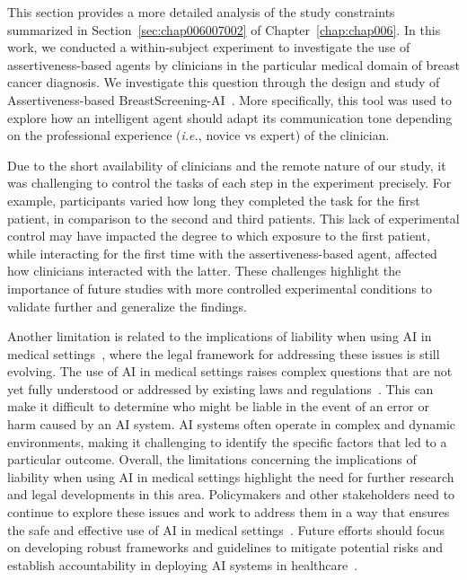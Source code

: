 This section provides a more detailed analysis of the study constraints summarized in Section~\ref{sec:chap006007002} of Chapter~\ref{chap:chap006}.
In this work, we conducted a within-subject experiment to investigate the use of assertiveness-based agents by clinicians in the particular medical domain of breast cancer diagnosis.
We investigate this question through the design and study of Assertiveness-based BreastScreening-AI~\cite{10.1145/3544548.3580682}.
More specifically, this tool was used to explore how an intelligent agent should adapt its communication tone depending on the professional experience ({\it i.e.}, novice vs expert) of the clinician.

Due to the short availability of clinicians and the remote nature of our study, it was challenging to control the tasks of each step in the experiment precisely.
For example, participants varied how long they completed the task for the first patient, in comparison to the second and third patients.
This lack of experimental control may have impacted the degree to which exposure to the first patient, while interacting for the first time with the assertiveness-based agent, affected how clinicians interacted with the latter.
These challenges highlight the importance of future studies with more controlled experimental conditions to validate further and generalize the findings.

Another limitation is related to the implications of liability when using \ac{AI} in medical settings~\cite{10.1145/3555157}, where the legal framework for addressing these issues is still evolving.
The use of \ac{AI} in medical settings raises complex questions that are not yet fully understood or addressed by existing laws and regulations~\cite{10.1145/3411764.3445432}.
This can make it difficult to determine who might be liable in the event of an error or harm caused by an \ac{AI} system.
\ac{AI} systems often operate in complex and dynamic environments, making it challenging to identify the specific factors that led to a particular outcome.
Overall, the limitations concerning the implications of liability when using \ac{AI} in medical settings highlight the need for further research and legal developments in this area.
Policymakers and other stakeholders need to continue to explore these issues and work to address them in a way that ensures the safe and effective use of \ac{AI} in medical settings~\cite{10.1145/3544549.3573827}.
Future efforts should focus on developing robust frameworks and guidelines to mitigate potential risks and establish accountability in deploying \ac{AI} systems in healthcare~\cite{10.1145/3544548.3581393}.

